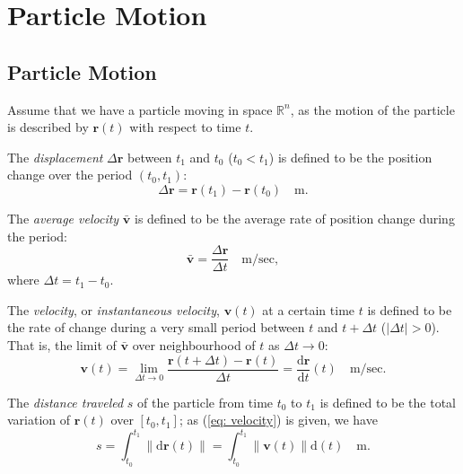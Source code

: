 
\chapter{Particle Motion}



\section{Particle Motion}
\label{sec: particle motion}


Assume that we have a particle moving in space $\mathbb R^n$, as the motion of the particle is described by $\mathbf r(t)$ with respect to time $t$.

The \textit{displacement} $\Delta \mathbf r$ between $t_1$ and $t_0$  ($t_0 < t_1$) is defined to be the position change over the period $(t_0, t_1)$:
\begin{equation}
	\label{eq: displacement}
	\Delta \mathbf r = \mathbf r(t_1) - \mathbf r(t_0) \quad \mathrm {m}.
\end{equation}

The \textit{average velocity} $\mathbf{\bar v}$ is defined to be the average rate of position change during the period:
\begin{equation}
	\label{eq: ave velocity}
	\mathbf{\bar v} = \frac{\Delta \mathbf r}{\Delta t} \quad \mathrm{m / sec},
\end{equation}
where $\Delta t = t_1 - t_0$.

The \textit{velocity}, or \textit{instantaneous velocity}, $\mathbf v(t)$ at a certain time $t$ is defined to be the rate of change during a very small period between $t$ and $t + \Delta t$ ($|\Delta t| > 0$). That is, the limit of $\mathbf{\bar v}$ over neighbourhood of $t$ as $\Delta t \to 0$:
\begin{equation}
	\label{eq: velocity}
	\mathbf v(t) = \lim_{\Delta t \to 0} \frac{\mathbf r(t + \Delta t) - \mathbf r(t)}{\Delta t} = \frac{\mathrm d \mathbf r}{\mathrm d t}(t) \quad \mathrm{m/sec}.
\end{equation}

The \textit{distance traveled} $s$ of the particle from time $t_0$ to $t_1$ is defined to be the total variation of $\mathbf r(t)$ over $[t_0, t_1]$; as (\ref{eq: velocity}) is given, we have
\begin{equation}
	\label{eq: distance traveled}
	s = \int_{t_0}^{t_1} \| \mathrm d\mathbf r(t) \| = \int_{t_0}^{t_1} \| \mathbf v(t) \| \mathrm d(t) \quad \mathrm{m}.
\end{equation}

